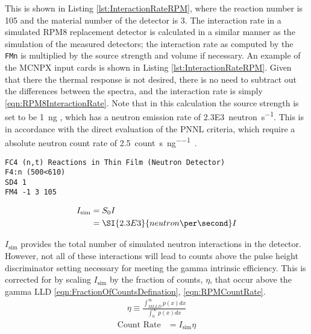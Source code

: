 This is shown in Listing \ref{lst:InteractionRateRPM}, where the reaction number is 105 and the material number of the detector is 3.
The interaction rate in a simulated RPM8 replacement detector is calculated in a similar manner as the simulation of the measured detectors; the interaction rate as computed by the \verb+FMn+ is multiplied by the source strength and volume if necessary.
An example of the MCNPX input cards is shown in Listing \ref{lst:InteractionRateRPM}.
Given that there the thermal response is not desired, there is no need to subtract out the differences between the spectra, and the interaction rate is simply \eqref{eqn:RPM8InteractionRate}.
Note that in this calculation the source strength is set to be \SI{1}{\nano\gram} , which has a neutron emission rate of \SI{2.3E3}{neutron\per\second}.
This is in accordance with the direct evaluation of the PNNL criteria, which require a absolute neutron count rate of \SI{2.5}{count\per\second\per\nano\gram{}}.
\begin{lstlisting}[caption={[RPM8 ${}^{6}\text{Li}\left(\text{n},\text{t}\right)\alpha$ Reaction Rate]RPM8 ${}^{6}\text{Li}\left(\text{n},\text{t}\right)\alpha$ Reaction Rate. The detector is all of the layers of cell 500 inside universe 610. This tally is multiplied by an SD card to normalize by the volume},label={lst:InteractionRateRPM}]
FC4 (n,t) Reactions in Thin Film (Neutron Detector)
F4:n (500<610)
SD4 1
FM4 -1 3 105
\end{lstlisting}
\begin{align}
  \label{eqn:RPM8InteractionRate}
  I_{\text{sim}} &= S_0 I \\
  &= \SI{2.3E3}{neutron\per\second} I
\end{align}

$I_{\text{sim}}$ provides the total number of simulated neutron interactions in the detector.
However, not all of these interactions will lead to counts above the pulse height discriminator setting necessary for meeting the gamma intrinsic efficiency.
This is corrected for by scaling $I_{\text{sim}}$ by the fraction of counts, $\eta$, that occur above the gamma LLD \eqref{eqn:FractionOfCountsDefination}, \eqref{eqn:RPMCountRate}.
\begin{align}
  \label{eqn:FractionOfCountsDefination}
  \eta \equiv \frac{\int_{MLLD}^\infty p(x)dx}{\int_0^\infty p(x)dx}
\end{align}
\begin{align}
 \label{eqn:RPMCountRate}
 \text{Count Rate} &= I_{\text{sim}} \eta
\end{align}


